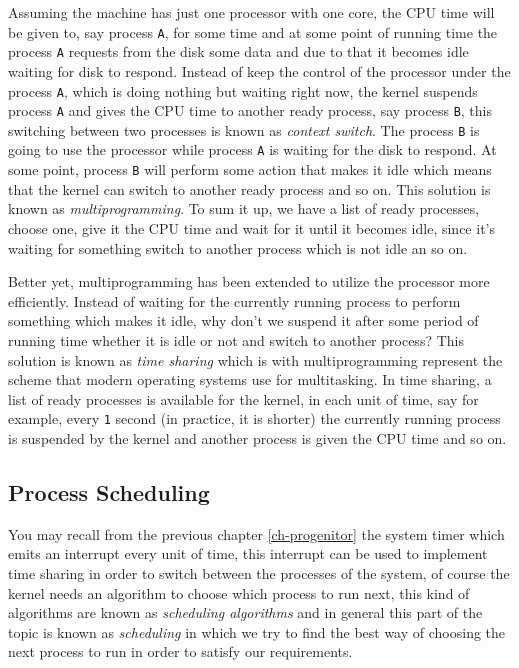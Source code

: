 Assuming the machine has just one processor with one core, the CPU time
will be given to, say process \lstinline!A!, for some time and at some
point of running time the process \lstinline!A! requests from the disk
some data and due to that it becomes idle waiting for disk to respond.
Instead of keep the control of the processor under the process
\lstinline!A!, which is doing nothing but waiting right now, the kernel
suspends process \lstinline!A! and gives the CPU time to another ready
process, say process \lstinline!B!, this switching between two processes
is known as \emph{context switch}. The process \lstinline!B! is going to
use the processor while process \lstinline!A! is waiting for the disk to
respond. At some point, process \lstinline!B! will perform some action
that makes it idle which means that the kernel can switch to another
ready process and so on. This solution is known as
\emph{multiprogramming}. To sum it up, we have a list of ready
processes, choose one, give it the CPU time and wait for it until it
becomes idle, since it's waiting for something switch to another process
which is not idle an so on.

Better yet, multiprogramming has been extended to utilize the processor
more efficiently. Instead of waiting for the currently running process
to perform something which makes it idle, why don't we suspend it after
some period of running time whether it is idle or not and switch to
another process? This solution is known as \emph{time sharing} which is
with multiprogramming represent the scheme that modern operating systems
use for multitasking. In time sharing, a list of ready processes is
available for the kernel, in each unit of time, say for example, every
\lstinline!1! second (in practice, it is shorter) the currently running
process is suspended by the kernel and another process is given the CPU
time and so on.

\subsection{Process Scheduling}\label{process-scheduling}

You may recall from the previous chapter \ref{ch-progenitor} the system
timer which emits an interrupt every unit of time, this interrupt can be
used to implement time sharing in order to switch between the processes
of the system, of course the kernel needs an algorithm to choose which
process to run next, this kind of algorithms are known as
\emph{scheduling algorithms} and in general this part of the topic is
known as \emph{scheduling} in which we try to find the best way of
choosing the next process to run in order to satisfy our requirements.

